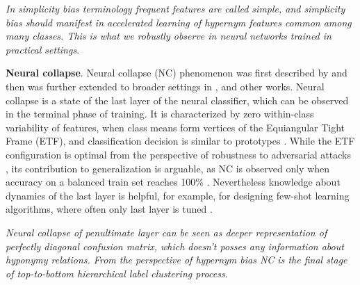 
\textit{In simplicity bias terminology frequent features are called simple, and
  simplicity bias should manifest in accelerated learning of hypernym features
  common among many classes. This is what we robustly observe in neural networks
  trained in practical settings}.


\textbf{Neural collapse}. Neural collapse (NC) phenomenon was first described
by \cite{papyan2020prevalence} and then was further extended to broader settings
in \citep{dang2024neural}, \citep{fang2021exploring} and other works. Neural
collapse is a state of the last layer of the neural classifier, which can be
observed in the terminal phase of training. It is characterized by zero
within-class variability of features, when class means form vertices of the
Equiangular Tight Frame (ETF), and classification decision is similar to
prototypes \citep{snell2017prototypical}. While the ETF configuration is optimal
from the perspective of robustness to adversarial attacks
\citep{papyan2020prevalence}, its contribution to generalization is arguable, as
NC is observed only when accuracy on a balanced train set reaches 100\%
\citep{hui2022limitations}. Nevertheless knowledge about dynamics of the last
layer is helpful, for example, for designing few-shot learning algorithms, where
often only last layer is tuned \citep{yang2023neural}.

\textit{Neural collapse of penultimate layer can be seen as deeper
  representation of perfectly diagonal confusion matrix, which doesn't posses
  any information about hyponymy relations. From the perspective of hypernym
  bias NC is the final stage of top-to-bottom hierarchical label clustering
  process}.